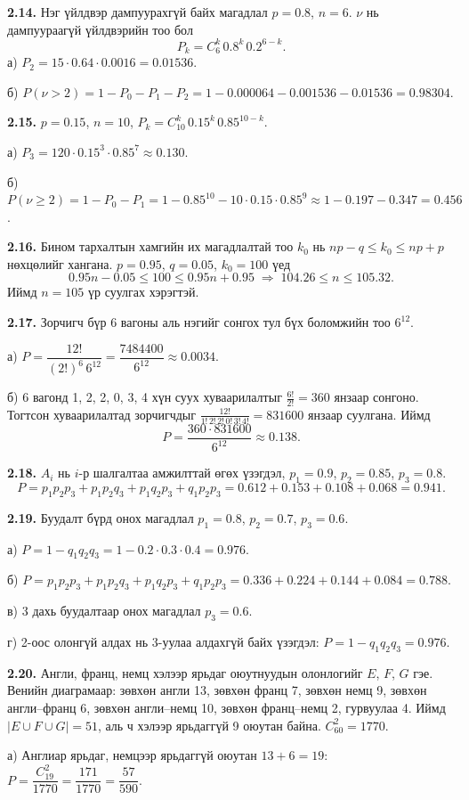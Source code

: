 \documentclass[11pt,a4paper]{article}
\newcommand{\bod}[1]{\par\medskip\noindent\textbf{#1}\quad}
\begin{document}
\bod{2.14.}
Нэг үйлдвэр дампуурахгүй байх магадлал $p=0.8$, $n=6$. $\nu$ нь дампуураагүй үйлдвэрийн тоо бол
\[
P_k=C_6^k\,0.8^k\,0.2^{6-k}.
\]
а) $P_2=15\cdot0.64\cdot0.0016=0.01536$.

б) $P(\nu>2)=1-P_0-P_1-P_2=1-0.000064-0.001536-0.01536=0.98304$.

\bod{2.15.}
$p=0.15$, $n=10$, $P_k=C_{10}^k\,0.15^k\,0.85^{10-k}$.

а) $P_3=120\cdot0.15^3\cdot0.85^7\approx0.130$.

б) $P(\nu\ge2)=1-P_0-P_1=1-0.85^{10}-10\cdot0.15\cdot0.85^9\approx1-0.197-0.347=0.456$.

\bod{2.16.}
Бином тархалтын хамгийн их магадлалтай тоо $k_0$ нь $np-q\le k_0\le np+p$ нөхцөлийг хангана. $p=0.95$, $q=0.05$, $k_0=100$ үед
\[
0.95n-0.05\le100\le0.95n+0.95
\;\Longrightarrow\;
104.26\le n\le105.32 .
\]
Иймд $n=105$ үр суулгах хэрэгтэй.

\bod{2.17.}
Зорчигч бүр 6 вагоны аль нэгийг сонгох тул бүх боломжийн тоо $6^{12}$.

а) $P=\dfrac{12!}{(2!)^6\,6^{12}}=\dfrac{7484400}{6^{12}}\approx0.0034$.

б) 6 вагонд 1, 2, 2, 0, 3, 4 хүн суух хуваарилалтыг $\frac{6!}{2!}=360$ янзаар сонгоно. Тогтсон хуваарилалтад зорчигчдыг $\frac{12!}{1!\,2!\,2!\,0!\,3!\,4!}=831600$ янзаар суулгана. Иймд
\[
P=\frac{360\cdot831600}{6^{12}}\approx0.138 .
\]

\bod{2.18.}
$A_i$ нь $i$-р шалгалтаа амжилттай өгөх үзэгдэл, $p_1=0.9$, $p_2=0.85$, $p_3=0.8$.
\[
P=p_1p_2p_3+p_1p_2q_3+p_1q_2p_3+q_1p_2p_3=0.612+0.153+0.108+0.068=0.941 .
\]

\bod{2.19.}
Буудалт бүрд онох магадлал $p_1=0.8$, $p_2=0.7$, $p_3=0.6$.

а) $P=1-q_1q_2q_3=1-0.2\cdot0.3\cdot0.4=0.976$.

б) $P=p_1p_2p_3+p_1p_2q_3+p_1q_2p_3+q_1p_2p_3=0.336+0.224+0.144+0.084=0.788$.

в) 3 дахь буудалтаар онох магадлал $p_3=0.6$.

г) 2-оос олонгүй алдах нь 3-уулаа алдахгүй байх үзэгдэл: $P=1-q_1q_2q_3=0.976$.

\bod{2.20.}
Англи, франц, немц хэлээр ярьдаг оюутнуудын олонлогийг $E$, $F$, $G$ гэе. Венийн диаграмаар:
зөвхөн англи 13, зөвхөн франц 7, зөвхөн немц 9, зөвхөн англи--франц 6, зөвхөн англи--немц 10, зөвхөн франц--немц 2, гурвуулаа 4. Иймд $|E\cup F\cup G|=51$, аль ч хэлээр ярьдаггүй 9 оюутан байна. $C_{60}^2=1770$.

а) Англиар ярьдаг, немцээр ярьдаггүй оюутан $13+6=19$: $P=\dfrac{C_{19}^2}{1770}=\dfrac{171}{1770}=\dfrac{57}{590}$.
\end{document}
